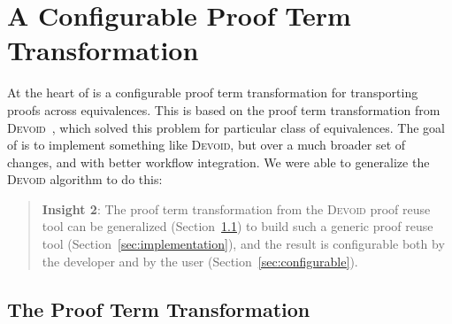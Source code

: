 \section{A Configurable Proof Term Transformation}
\label{sec:key2}

At the heart of \toolname is a configurable proof term transformation for transporting
proofs across equivalences. This is based on the proof term transformation from 
\textsc{Devoid}~\cite{Ringer2019}, which solved this problem for particular class of equivalences.
The goal of \toolname is to implement something like \textsc{Devoid}, but over
a much broader set of changes, and with better workflow integration.
We were able to generalize the \textsc{Devoid} algorithm to do this:

\begin{quote}
\textbf{Insight 2}:
The proof term transformation from the \textsc{Devoid} proof reuse tool can be generalized (Section~\ref{sec:generic})
to build such a generic proof reuse tool (Section~\ref{sec:implementation}),
and the result is configurable both by the developer and by the user (Section~\ref{sec:configurable}).
\end{quote}

\subsection{The Proof Term Transformation}
\label{sec:generic}

